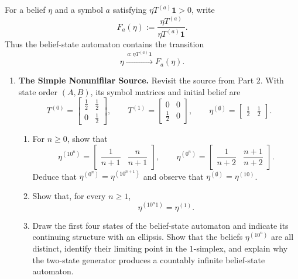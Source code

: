 \begin{exercise}
\label{ex:p3-3}
  For a belief $\eta$ and a symbol $a$ satisfying
  $\eta T^{(a)}\mathbf 1>0$, write
  \[
    F_a(\eta):=\frac{\eta T^{(a)}}{\eta T^{(a)}\mathbf 1}.
  \]
  Thus the belief-state automaton contains the transition
  \[
    \eta\xrightarrow{\,a:\eta T^{(a)}\mathbf 1\,}F_a(\eta).
  \]

  \begin{enumerate}
    \item \textbf{The Simple Nonunifilar Source.}
      Revisit the source from Part 2. With state order $(A,B)$, its symbol
      matrices and initial belief are
      \[
        T^{(0)}=
        \begin{bmatrix}\tfrac12&\tfrac12\\0&\tfrac12\end{bmatrix},
        \qquad
        T^{(1)}=
        \begin{bmatrix}0&0\\\tfrac12&0\end{bmatrix},
        \qquad
        \eta^{(\emptyset)}=\begin{bmatrix}\tfrac12&\tfrac12\end{bmatrix}.
      \]
      \begin{enumerate}
        \item For $n\geq0$, show that
          \[
            \eta^{(10^n)}=
              \begin{bmatrix}\dfrac1{n+1}&\dfrac n{n+1}\end{bmatrix},
            \qquad
            \eta^{(0^n)}=
              \begin{bmatrix}\dfrac1{n+2}&\dfrac{n+1}{n+2}\end{bmatrix}.
          \]
          Deduce that
          $\eta^{(0^n)}=\eta^{(10^{n+1})}$ and observe that
          $\eta^{(\emptyset)}=\eta^{(10)}$.

        \item Show that, for every $n\geq1$,
          \[
            \eta^{(10^n1)}=\eta^{(1)}.
          \]

        \item Draw the first four states of the belief-state automaton and
          indicate its continuing structure with an ellipsis. Show that the
          beliefs $\eta^{(10^n)}$ are all distinct, identify their limiting
          point in the $1$-simplex, and explain why the two-state generator
          produces a countably infinite belief-state automaton.
      \end{enumerate}


\end{enumerate}
\end{exercise}
